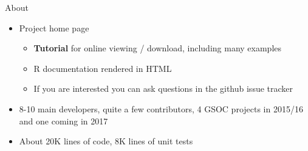 \begin{vframe}{About}
  \begin{itemize}
    \item Project home page\\
      \begin{itemize}
        \item \textbf{Tutorial} for online viewing / download, including many examples
        \item R documentation rendered in HTML
        \item If you are interested you can ask questions in the github issue tracker
      \end{itemize}
    \item 8-10 main developers, quite a few contributors, 4 GSOC projects in 2015/16 and 
    one coming in 2017
    \item About 20K lines of code, 8K lines of unit tests
  \end{itemize}
\end{vframe}


% 



